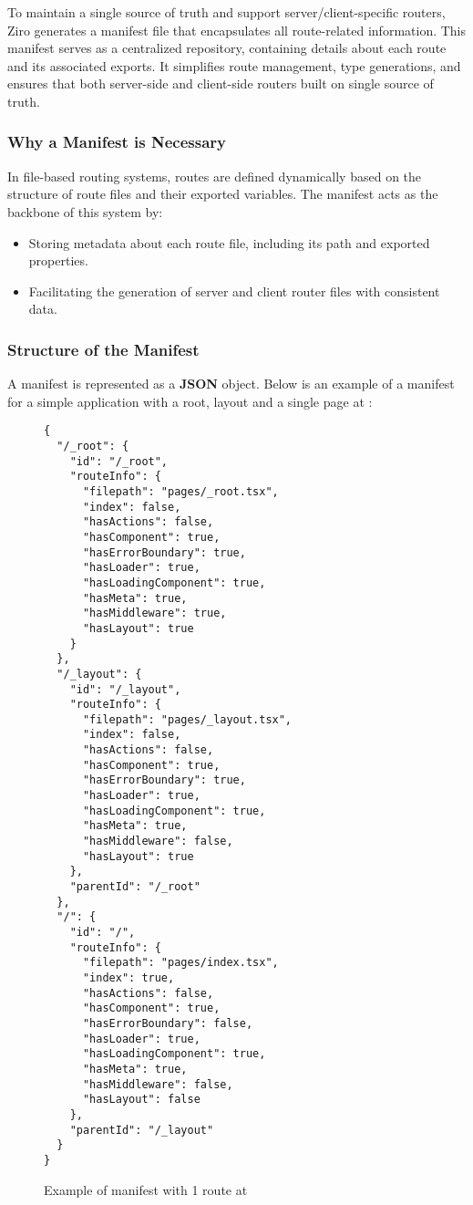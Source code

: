 To maintain a single source of truth and support server/client-specific routers, Ziro generates a manifest file that encapsulates all route-related information. This manifest serves as a centralized repository, containing details about each route and its associated exports. It simplifies route management, type generations, and ensures that both server-side and client-side routers built on single source of truth.

\subsubsection{Why a Manifest is Necessary}

In file-based routing systems, routes are defined dynamically based on the structure of route files and their exported variables. The manifest acts as the backbone of this system by:

\begin{itemize}
	\item Storing metadata about each route file, including its path and exported properties.
	\item Facilitating the generation of server and client router files with consistent data.
\end{itemize}

\subsubsection{Structure of the Manifest}
A manifest is represented as a \textbf{JSON} object. Below is an example of a manifest for a simple application with a root, layout and a single page at \cc{/}:

\pagebreak
\begin{figure}[H]
\begin{verbatim}
{
  "/_root": {
    "id": "/_root",
    "routeInfo": {
      "filepath": "pages/_root.tsx",
      "index": false,
      "hasActions": false,
      "hasComponent": true,
      "hasErrorBoundary": true,
      "hasLoader": true,
      "hasLoadingComponent": true,
      "hasMeta": true,
      "hasMiddleware": true,
      "hasLayout": true
    }
  },
  "/_layout": {
    "id": "/_layout",
    "routeInfo": {
      "filepath": "pages/_layout.tsx",
      "index": false,
      "hasActions": false,
      "hasComponent": true,
      "hasErrorBoundary": true,
      "hasLoader": true,
      "hasLoadingComponent": true,
      "hasMeta": true,
      "hasMiddleware": false,
      "hasLayout": true
    },
    "parentId": "/_root"
  },
  "/": {
    "id": "/",
    "routeInfo": {
      "filepath": "pages/index.tsx",
      "index": true,
      "hasActions": false,
      "hasComponent": true,
      "hasErrorBoundary": false,
      "hasLoader": true,
      "hasLoadingComponent": true,
      "hasMeta": true,
      "hasMiddleware": false,
      "hasLayout": false
    },
    "parentId": "/_layout"
  }
}
\end{verbatim}
\caption{Example of manifest with 1 route at \cc{/}}
\end{figure}

